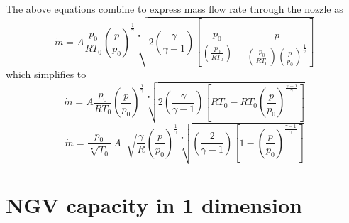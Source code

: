 \documentclass[a4paper, 11pt, twoside]{report}
\begin{document}
The above equations combine to express mass flow rate through the nozzle as
\begin{equation}
\dot{m} =
A
\frac{p_0}{R T_0}
\left(\frac{p}{p_0}\right)^\frac{1}{\gamma}
\sqrt[•]{ 
2 \left( \frac{\gamma}{\gamma - 1} \right) 
\left[ \frac{p_0}{ \left( \frac{p_0}{R T_0} \right) } - \frac{p}{ \left( \frac{p_0}{R T_0} \right) \left(\frac{p}{p_0}\right)^\frac{1}{\gamma} } \right] 
}
\end{equation}
which simplifies to
\begin{equation}
\dot{m} =
A
\frac{p_0}{R T_0}
\left(\frac{p}{p_0}\right)^\frac{1}{\gamma}
\sqrt[•]{
	2 \left( 
		\frac{\gamma}{\gamma - 1} 
	\right)
	\left[ 
		R T_0 - R T_0 \left( \frac{p}{p_0} \right)^\frac{\gamma-1}{\gamma} 
	\right]
}
\end{equation}
\begin{equation}
\dot{m} =
\frac{p_0}{\sqrt[•]{T_0}} \>
A \;
\sqrt[]{\frac{\gamma}{R}}
\left(
    \frac{p}{p_0}
\right)^\frac{1}{\gamma}
\sqrt[•]{
	\left(
		\frac{2}{\gamma - 1}  
	\right)
	\left[
		1 - \left( \frac{p}{p_0} \right)^\frac{\gamma-1}{\gamma}
	\right] 
}
\end{equation}


\section{NGV capacity in 1 dimension}
\end{document}
